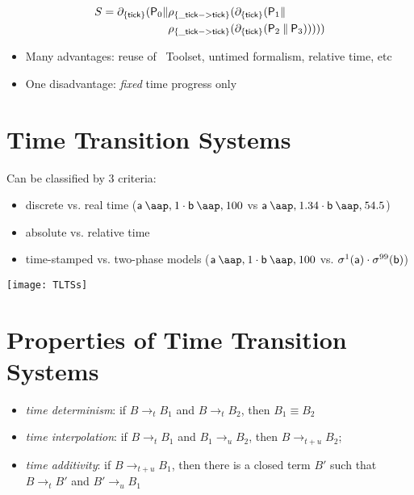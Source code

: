 \begin{slide}
\begin{gather*}
\begin{split}
S=\partial_{\{\mathsf{tick}\}}(\mathsf{P}_0\mathbin{\parallel}&\rho_{\{\mathsf{\_tick}->\mathsf{tick}\}}(\partial_{\{\mathsf{tick}\}}(\mathsf{P}_1\mathbin{\parallel}\\
&\rho_{\{\mathsf{\_tick}->\mathsf{tick}\}}(\partial_{\{\mathsf{tick}\}}(\mathsf{P}_2\mathbin{\parallel}\mathsf{P}_3)))))
\end{split}
\end{gather*}
\pause
\begin{itemize}
\item Many advantages: reuse of \mcrl\ Toolset, untimed formalism, relative time, etc
\item One disadvantage: \emph{fixed} time progress only
\end{itemize}
\newslide\section*{Time Transition Systems}
Can be classified by 3 criteria:
\begin{itemize}
\item discrete vs. real time ($\act{a}\at{1}\seqc\act{b}\at{100}$ vs $\act{a}\at{1.34}\seqc\act{b}\at{54.5}$)
\item absolute vs. relative time
\item time-stamped vs. two-phase models ($\act{a}\at{1}\seqc\act{b}\at{100}$ vs. $\sigma^1(\mathsf{a})\mathbin{\cdot}\sigma^{99}(\mathsf{b})$)
\end{itemize}
\pause
\begin{center}
\texttt{[image: TLTSs]}
\end{center}
\newslide\section*{Properties of Time Transition Systems}
\begin{itemize}
\item \emph{time determinism}: if $B \to_t B_1$ and $B \to_t B_2$, then $B_1\equiv B_2$
\item \emph{time interpolation}: if $B \to_t B_1$ and $B_1 \to_u B_2$, then $B \to_{t+u}B_2$;
\item \emph{time additivity}: if $B \to_{t+u} B_1$, then there is a closed term $B'$ such that $B\to_{t} B'$ and $B'\to_{u} B_1$
\end{itemize}

\end{slide}
